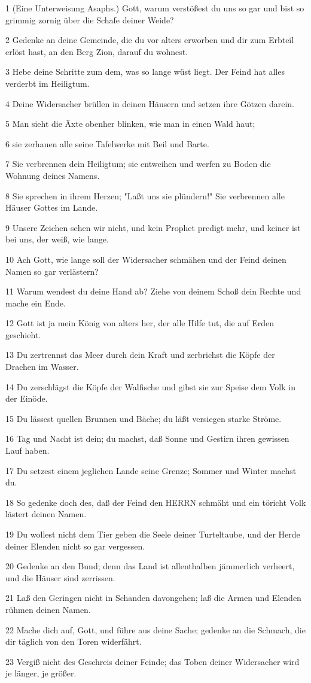 \par 1 (Eine Unterweisung Asaphs.) Gott, warum verstößest du uns so gar und bist so grimmig zornig über die Schafe deiner Weide?
\par 2 Gedenke an deine Gemeinde, die du vor alters erworben und dir zum Erbteil erlöst hast, an den Berg Zion, darauf du wohnest.
\par 3 Hebe deine Schritte zum dem, was so lange wüst liegt. Der Feind hat alles verderbt im Heiligtum.
\par 4 Deine Widersacher brüllen in deinen Häusern und setzen ihre Götzen darein.
\par 5 Man sieht die Äxte obenher blinken, wie man in einen Wald haut;
\par 6 sie zerhauen alle seine Tafelwerke mit Beil und Barte.
\par 7 Sie verbrennen dein Heiligtum; sie entweihen und werfen zu Boden die Wohnung deines Namens.
\par 8 Sie sprechen in ihrem Herzen; "Laßt uns sie plündern!" Sie verbrennen alle Häuser Gottes im Lande.
\par 9 Unsere Zeichen sehen wir nicht, und kein Prophet predigt mehr, und keiner ist bei uns, der weiß, wie lange.
\par 10 Ach Gott, wie lange soll der Widersacher schmähen und der Feind deinen Namen so gar verlästern?
\par 11 Warum wendest du deine Hand ab? Ziehe von deinem Schoß dein Rechte und mache ein Ende.
\par 12 Gott ist ja mein König von alters her, der alle Hilfe tut, die auf Erden geschieht.
\par 13 Du zertrennst das Meer durch dein Kraft und zerbrichst die Köpfe der Drachen im Wasser.
\par 14 Du zerschlägst die Köpfe der Walfische und gibst sie zur Speise dem Volk in der Einöde.
\par 15 Du lässest quellen Brunnen und Bäche; du läßt versiegen starke Ströme.
\par 16 Tag und Nacht ist dein; du machst, daß Sonne und Gestirn ihren gewissen Lauf haben.
\par 17 Du setzest einem jeglichen Lande seine Grenze; Sommer und Winter machst du.
\par 18 So gedenke doch des, daß der Feind den HERRN schmäht und ein töricht Volk lästert deinen Namen.
\par 19 Du wollest nicht dem Tier geben die Seele deiner Turteltaube, und der Herde deiner Elenden nicht so gar vergessen.
\par 20 Gedenke an den Bund; denn das Land ist allenthalben jämmerlich verheert, und die Häuser sind zerrissen.
\par 21 Laß den Geringen nicht in Schanden davongehen; laß die Armen und Elenden rühmen deinen Namen.
\par 22 Mache dich auf, Gott, und führe aus deine Sache; gedenke an die Schmach, die dir täglich von den Toren widerfährt.
\par 23 Vergiß nicht des Geschreis deiner Feinde; das Toben deiner Widersacher wird je länger, je größer.

